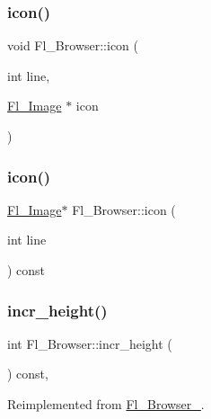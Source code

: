 \subsubsection{\texorpdfstring{icon()}{icon()}\hspace{0.1cm}{\footnotesize\ttfamily [1/2]}}
{\footnotesize\ttfamily void Fl\+\_\+\+Browser\+::icon (\begin{DoxyParamCaption}\item[{int}]{line,  }\item[{\hyperlink{class_fl___image}{Fl\+\_\+\+Image} $\ast$}]{icon }\end{DoxyParamCaption})}

\mbox{\label{class_fl___browser_ad09239c82d1fe044b1f9a9366fd375e8}} 
\subsubsection{\texorpdfstring{icon()}{icon()}\hspace{0.1cm}{\footnotesize\ttfamily [2/2]}}
{\footnotesize\ttfamily \hyperlink{class_fl___image}{Fl\+\_\+\+Image}$\ast$ Fl\+\_\+\+Browser\+::icon (\begin{DoxyParamCaption}\item[{int}]{line }\end{DoxyParamCaption}) const}

\mbox{\label{class_fl___browser_aa26afc5b34fea349c1baa25f086ba08a}} 
\subsubsection{\texorpdfstring{incr\+\_\+height()}{incr\_height()}}
{\footnotesize\ttfamily int Fl\+\_\+\+Browser\+::incr\+\_\+height (\begin{DoxyParamCaption}{ }\end{DoxyParamCaption}) const\hspace{0.3cm}{\ttfamily [protected]}, {\ttfamily [virtual]}}



Reimplemented from \hyperlink{class_fl___browser___aff44d1df61b13c4ef50636dc7e140cb3}{Fl\+\_\+\+Browser\+\_\+}.




